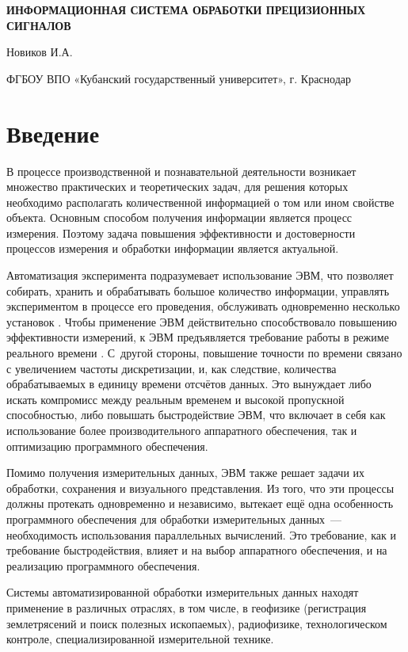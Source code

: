 \documentclass[a4paper, 14pt]{extarticle}
\author{\theauthor, \theinstitute}
\title{\thetitle}
\newcommand\sectiontoc[1]{\section*{#1}\addcontentsline{toc}{section}{#1}}
\newcommand{\thetitle}{ИНФОРМАЦИОННАЯ СИСТЕМА ОБРАБОТКИ ПРЕЦИЗИОННЫХ СИГНАЛОВ}
\newcommand{\theauthor}{Новиков И.А.}
\newcommand{\theinstitute}{ФГБОУ ВПО «Кубанский государственный университет»}
\begin{document}
  \begin{center}
    \textbf{\thetitle}

    \theauthor

    \theinstitute, г. Краснодар
  \end{center}

  \sectiontoc{Введение}\label{sec:intro}

  В процессе производственной и познавательной деятельности возникает множество практических и
  теоретических задач, для решения которых необходимо располагать количественной информацией о том
  или ином свойстве объекта. Основным способом получения информации является процесс измерения.
  Поэтому задача повышения эффективности и достоверности процессов измерения и обработки информации
  является актуальной.

  Автоматизация эксперимента подразумевает использование ЭВМ, что позволяет
  собирать, хранить и обрабатывать большое количество информации, управлять экспериментом в процессе
  его проведения, обслуживать одновременно несколько установок \cite{petronevich-automation}.
  Чтобы применение ЭВМ действительно способствовало повышению эффективности измерений, к ЭВМ
  предъявляется требование работы в режиме реального времени
  \cite{tessier-reconfigurable}. С~другой
  стороны, повышение точности по времени связано с увеличением частоты дискретизации, и, как
  следствие, количества обрабатываемых в единицу времени отсчётов данных. Это вынуждает либо искать
  компромисс между реальным временем и высокой пропускной способностью, либо повышать быстродействие
  ЭВМ, что включает в себя как использование более производительного аппаратного обеспечения, так и
  оптимизацию программного обеспечения.

  Помимо получения измерительных данных, ЭВМ также решает задачи их обработки, сохранения и
  визуального представления. Из того, что эти процессы должны протекать одновременно и независимо,
  вытекает ещё одна особенность программного обеспечения для обработки измерительных данных~---
  необходимость использования параллельных вычислений. Это требование, как и требование
  быстродействия, влияет и на выбор аппаратного обеспечения, и на реализацию программного обеспечения.

  Системы автоматизированной обработки измерительных данных находят применение в различных отраслях,
  в том числе, в геофизике (регистрация землетрясений и поиск полезных ископаемых), радиофизике,
  технологическом контроле, специализированной измерительной технике.
\end{document}
